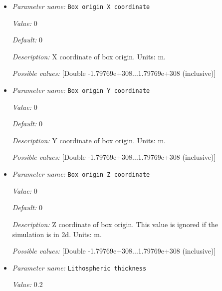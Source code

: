\begin{itemize}
\item {\it Parameter name:} {\tt Box origin X coordinate}
\label{parameters:Geometry model/Box with lithosphere boundary indicators/Box origin X coordinate}


{\it Value:} 0


{\it Default:} 0


{\it Description:} X coordinate of box origin. Units: m.


{\it Possible values:} [Double -1.79769e+308...1.79769e+308 (inclusive)]
\item {\it Parameter name:} {\tt Box origin Y coordinate}
\label{parameters:Geometry model/Box with lithosphere boundary indicators/Box origin Y coordinate}


{\it Value:} 0


{\it Default:} 0


{\it Description:} Y coordinate of box origin. Units: m.


{\it Possible values:} [Double -1.79769e+308...1.79769e+308 (inclusive)]
\item {\it Parameter name:} {\tt Box origin Z coordinate}
\label{parameters:Geometry model/Box with lithosphere boundary indicators/Box origin Z coordinate}


{\it Value:} 0


{\it Default:} 0


{\it Description:} Z coordinate of box origin. This value is ignored if the simulation is in 2d. Units: m.


{\it Possible values:} [Double -1.79769e+308...1.79769e+308 (inclusive)]
\item {\it Parameter name:} {\tt Lithospheric thickness}
\label{parameters:Geometry model/Box with lithosphere boundary indicators/Lithospheric thickness}


{\it Value:} 0.2



\end{itemize}
